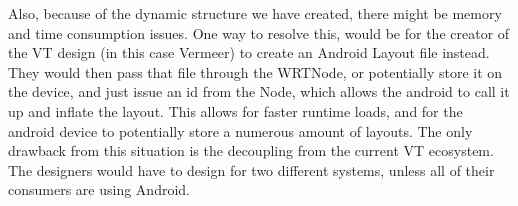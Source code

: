 \documentclass[paper=a4, fontsize=11pt]{scrartcl}
\numberwithin{equation}{section}		%
\numberwithin{figure}{section}			%
\numberwithin{table}{section}				%
\begin{document}
Also, because of the dynamic structure we have created, there might be memory and time consumption issues. One way to resolve this, would be for the creator of the VT design (in this case Vermeer) to create an Android Layout file instead. They would then pass that file through the WRTNode, or potentially store it on the device, and just issue an id from the Node, which allows the android to call it up and inflate the layout. This allows for faster runtime loads, and for the android device to potentially store a numerous amount of layouts. The only drawback from this situation is the decoupling from the current VT ecosystem. The designers would have to design for two different systems, unless all of their consumers are using Android.
\end{document}
